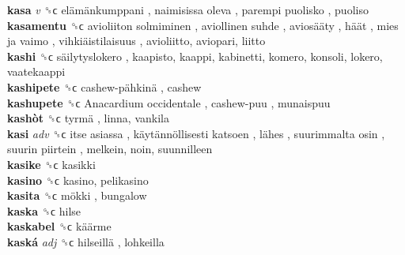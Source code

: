 \textbf{kasa} \emph{v}  ␝ϲ   elämänkumppani ,  naimisissa oleva ,  parempi puolisko , puoliso  \\
\textbf{kasamentu} ␝ϲ   avioliiton solmiminen ,  aviollinen suhde ,  aviosääty ,  häät ,  mies ja vaimo ,  vihkiäistilaisuus , avioliitto, aviopari, liitto  \\
\textbf{kashi} ␝ϲ   säilytyslokero , kaapisto, kaappi, kabinetti, komero, konsoli, lokero, vaatekaappi  \\
\textbf{kashipete} ␝ϲ   cashew-pähkinä , cashew  \\
\textbf{kashupete} ␝ϲ   Anacardium occidentale ,  cashew-puu , munaispuu  \\
\textbf{kashòt} ␝ϲ   tyrmä , linna, vankila  \\
\textbf{kasi} \emph{adv}  ␝ϲ   itse asiassa ,  käytännöllisesti katsoen ,  lähes ,  suurimmalta osin ,  suurin piirtein , melkein, noin, suunnilleen  \\
\textbf{kasike} ␝ϲ  kasikki  \\
\textbf{kasino} ␝ϲ  kasino, pelikasino  \\
\textbf{kasita} ␝ϲ   mökki , bungalow  \\
\textbf{kaska} ␝ϲ  hilse  \\
\textbf{kaskabel} ␝ϲ   käärme   \\
\textbf{kaská} \emph{adj}  ␝ϲ   hilseillä , lohkeilla  \\
